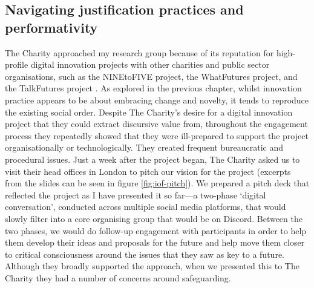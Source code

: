 \subsection{Navigating justification practices and performativity}
The Charity approached my research group because of its reputation for high-profile digital innovation projects with other charities and public sector organisations, such as the NINEtoFIVE project, the WhatFutures project, and the TalkFutures project \citep{lambton-howard_whatfutures_2019, rainey_talkfutures_2020, abdulgalimov_designing_2020}. As explored in the previous chapter, whilst innovation practice appears to be about embracing change and novelty, it tends to reproduce the existing social order. Despite The Charity's desire for a digital innovation project that they could extract discursive value from, throughout the engagement process they repeatedly showed that they were ill-prepared to support the project organisationally or technologically. They created frequent bureaucratic and procedural issues. Just a week after the project began, The Charity asked us to visit their head offices in London to pitch our vision for the project (excerpts from the slides can be seen in figure \ref{fig:iof-pitch}). We prepared a pitch deck that reflected the project as I have presented it so far—a two-phase `digital conversation', conducted across multiple social media platforms, that would slowly filter into a core organising group that would be on Discord. Between the two phases, we would do follow-up engagement with participants in order to help them develop their ideas and proposals for the future and help move them closer to critical consciousness around the issues that they saw as key to a future. Although they broadly supported the approach, when we presented this to The Charity they had a number of concerns around safeguarding. 

